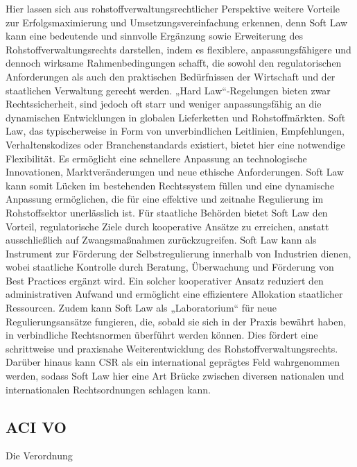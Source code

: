 \documentclass[12pt,a4paper,oneside]{book} %
\begin{document}
Hier lassen sich aus rohstoffverwaltungsrechtlicher Perspektive weitere Vorteile zur Erfolgsmaximierung und Umsetzungsvereinfachung erkennen, denn Soft Law kann eine bedeutende und sinnvolle Ergänzung sowie Erweiterung des Rohstoffverwaltungsrechts darstellen, indem es flexiblere, anpassungsfähigere und dennoch wirksame Rahmenbedingungen schafft, die sowohl den regulatorischen Anforderungen als auch den praktischen Bedürfnissen der Wirtschaft und der staatlichen Verwaltung gerecht werden. „Hard Law“-Regelungen bieten zwar Rechtssicherheit, sind jedoch oft starr und weniger anpassungsfähig an die dynamischen Entwicklungen in globalen Lieferketten und Rohstoffmärkten. Soft Law, das typischerweise in Form von unverbindlichen Leitlinien, Empfehlungen, Verhaltenskodizes oder Branchenstandards existiert, bietet hier eine notwendige Flexibilität. Es ermöglicht eine schnellere Anpassung an technologische Innovationen, Marktveränderungen und neue ethische Anforderungen. Soft Law kann somit Lücken im bestehenden Rechtssystem füllen und eine dynamische Anpassung ermöglichen, die für eine effektive und zeitnahe Regulierung im Rohstoffsektor unerlässlich ist. Für staatliche Behörden bietet Soft Law den Vorteil, regulatorische Ziele durch kooperative Ansätze zu erreichen, anstatt ausschließlich auf Zwangsmaßnahmen zurückzugreifen. Soft Law kann als Instrument zur Förderung der Selbstregulierung innerhalb von Industrien dienen, wobei staatliche Kontrolle durch Beratung, Überwachung und Förderung von Best Practices ergänzt wird. Ein solcher kooperativer Ansatz reduziert den administrativen Aufwand und ermöglicht eine effizientere Allokation staatlicher Ressourcen. Zudem kann Soft Law als „Laboratorium“ für neue Regulierungsansätze fungieren, die, sobald sie sich in der Praxis bewährt haben, in verbindliche Rechtsnormen überführt werden können. Dies fördert eine schrittweise und praxisnahe Weiterentwicklung des Rohstoffverwaltungsrechts. Darüber hinaus kann CSR als ein international geprägtes Feld wahrgenommen werden, sodass Soft Law hier eine Art Brücke zwischen diversen nationalen und internationalen Rechtsordnungen schlagen kann.


\subsection{ACI VO}
Die Verordnung 
\end{document}
